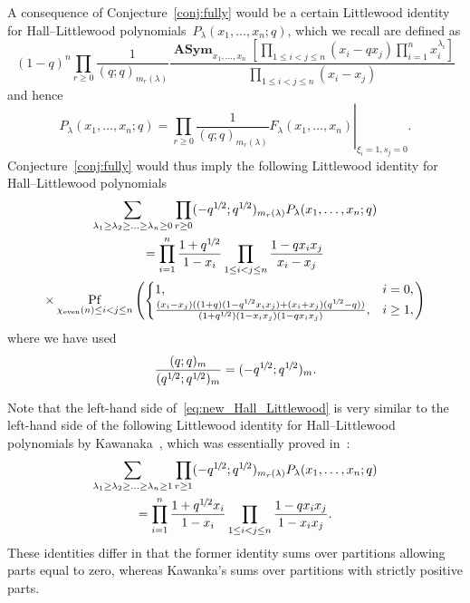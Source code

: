 \documentclass[ALCO, Unicode]{cedram}
\newcommand{\half}{1\mkern-2mu/\mkern-2mu2}
\DeclareMathOperator{\asym}{\mathbf{ASym}}
\DeclareMathOperator*{\pf}{Pf}
\begin{document}
	A consequence of Conjecture~\ref{conj:fully} would be a certain Littlewood identity for Hall--Littlewood polynomials~$P_{\lambda}(x_1,\ldots,x_n;q)$, which we recall are defined as
	\begin{equation*}
		(1-q)^n \prod_{r \ge 0} \frac{1}{(q;q)_{m_r(\lambda)}} \frac{\asym_{x_{1},\ldots,x_{n}}\left[\prod\limits_{1\le i<j\le n}(x_i- q x_j)\prod\limits_{i=1}^{n}x_{i}^{\lambda_{i}}\right]}{\prod\limits_{1\le i<j\le n}(x_{i}-x_{j})}
	\end{equation*}
	and hence
	\begin{equation*}
		\left. 
		P_{\lambda}(x_1,\ldots,x_n;q) = \prod_{r \ge 0} \frac{1}{(q;q)_{m_r(\lambda)}} F_{\lambda}(x_1,\ldots,x_n) \right|_{\xi_i=1,s_j=0}.
	\end{equation*}
	Conjecture~\ref{conj:fully} would thus imply the following Littlewood identity for Hall--Littlewood polynomials
	\begin{multline}\label{eq:new_Hall_Littlewood} 
		\sum_{\lambda_1 \ge \lambda_2 \ge \ldots \ge \lambda_n \ge 0}  \prod_{r \ge 0} (-q^{\half};q^{\half})_{m_r(\lambda)}  P_{\lambda}(x_1,\ldots,x_n;q)\\
		= \prod_{i=1}^{n} \frac{1+q^{\half}}{1- x_i}
		\prod_{1 \le i < j \le n} \frac{1-q  x_i x_j}{x_i-x_j} \\
		\times \pf_{\chi_{\mathrm{even}}(n) \le i < j \le n} \left(
		\begin{cases}
			1, & i=0,\\
			\frac{(x_i-x_j)((1+q)(1- q^{\half} x_i x_j) + (x_i + x_j)(q^{\half}- q))}{(1+q^{\half})(1- x_i x_j)(1- q x_i x_j)},& i\ge 1,
		\end{cases} \right)
	\end{multline}
	where we have used 
	\begin{equation*}
		\frac{(q;q)_{m}}{(q^{\half};q^{\half})_{m}}  = (-q^{\half};q^{\half})_{m}.
	\end{equation*}
	
	Note that the left-hand side of~\eqref{eq:new_Hall_Littlewood} is very similar to the left-hand side of the following Littlewood identity for Hall--Littlewood polynomials by Kawanaka~\cite[(1.21)]{Kaw99}, which was essentially proved in~\cite{Kaw91}:
	\begin{multline}\label{eq:Kawanaka} 
		\sum_{\lambda_1 \ge \lambda_2 \ge \ldots \ge \lambda_n \ge 1}  \prod_{r \ge 1} (-q^{\half};q^{\half})_{m_r(\lambda)}  P_{\lambda}(x_1,\ldots,x_n;q)\\
		= \prod_{i=1}^{n} \frac{1+q^{\half} x_i}{1- x_i}
		\prod_{1 \le i < j \le n} \frac{1-q  x_i x_j}{1-x_i x_j}.
	\end{multline}
	These identities differ in that the former identity sums over partitions allowing parts equal to zero, whereas Kawanka's sums over partitions with strictly positive parts.
	
\end{document}
